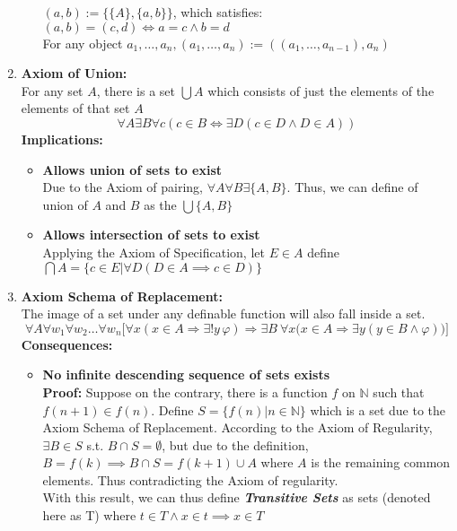 \documentclass{article}
\newcommand{\0}{{\bf{0}}}
\begin{document}
\begin{enumerate}
\begin{itemize}
        $(a,b):=\{\{A\},\{a,b\}\}$, which satisfies: $(a,b)=(c,d)\iff{}a=c\land{}b=d$\\
        For any object $a_1,\dots,a_n,(a_1,\dots,a_n):=((a_1,\dots,a_{n-1}),a_n)$
    \end{itemize}
    \item {\textbf{Axiom of Union:}}\\
    For any set $A$, there is a set $\bigcup{}A$ which consists of just the elements of the elements of that set $A$
    $$\forall{A}\exists{B}\forall{c}(c\in{B}\iff\exists{D}(c\in{D}\land{}D\in{A}))$$
    \textbf{Implications:}
    \begin{itemize}
        \item \textbf{Allows union of sets to exist}\\
        Due to the Axiom of pairing, $\forall{A}\forall{B}\exists\{A,B\}$. Thus, we can define of union of $A$ and $B$ as the $\bigcup\{A,B\}$
        \item \textbf{Allows intersection of sets to exist}\\
        Applying the Axiom of Specification, let $E\in{}A$ define $\bigcap{}A=\{c\in{}E|\forall{D}(D\in{}A\implies{}c\in{}D)\}$
    \end{itemize}
    \item {\textbf{Axiom Schema of Replacement:}}\\
    The image of a set under any definable function will also fall inside a set.
    $$\forall A\forall w_{1}\forall w_{2}\ldots \forall w_{n}{\bigl [}\forall x(x\in A\Rightarrow \exists !y\,\varphi )\Rightarrow \exists B\ \forall x{\bigl (}x\in A\Rightarrow \exists y(y\in B\land \varphi ){\bigr )}{\bigr ]}$$
    \textbf{Consequences:}
    \begin{itemize}
        \item \textbf{No infinite descending sequence of sets exists}\\
        \textbf{Proof:} Suppose on the contrary, there is a function $f$ on $\mathbb{N}$ such that $f(n+1)\in{}f(n)$. Define $S=\{f(n)|n\in\mathbb{N}\}$ which is a set due to the Axiom Schema of Replacement. According to the Axiom of Regularity, $\exists{}B\in{}S$ s.t. $B\cap{}S=\emptyset$, but due to the definition, $B=f(k)\implies{}B\cap{}S={f(k+1)\cup{}A}$ where $A$ is the remaining common elements. Thus contradicting the Axiom of regularity.\\
        With this result, we can thus define \textit{\textbf{Transitive Sets}} as sets (denoted here as T) where $t\in{}T\land{}x\in{}t\implies{}x\in{}T$\\

\end{itemize}
\end{enumerate}
\end{document}
